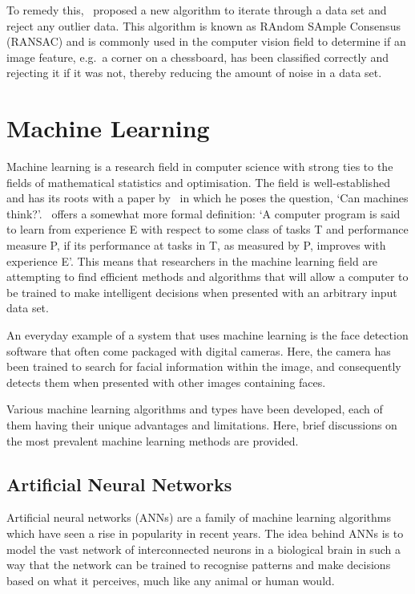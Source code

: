 To remedy this,~\cite{fischler1981random} proposed a new algorithm to iterate through a data set and reject any outlier data. This algorithm is known as RAndom SAmple Consensus (RANSAC) and is commonly used in the computer vision field to determine if an image feature, e.g.\ a corner on a chessboard, has been classified correctly and rejecting it if it was not, thereby reducing the amount of noise in a data set. 

\section{Machine Learning}

Machine learning is a research field in computer science with strong ties to the fields of mathematical statistics and optimisation. The field is well-es\-tab\-lished and has its roots with a paper by~\cite{turing1950computing} in which he poses the question, `Can machines think?'.~\cite{michalski2013machine} offers a somewhat more formal definition: `A computer program is said to learn from experience E with respect to some class of tasks T and performance measure P, if its performance at tasks in T, as measured by P, improves with experience E'. This means that researchers in the machine learning field are attempting to find efficient methods and algorithms that will allow a computer to be trained to make intelligent decisions when presented with an arbitrary input data set. 

An everyday example of a system that uses machine learning is the face detection software that often come packaged with digital cameras. Here, the camera has been trained to search for facial information within the image, and consequently detects them when presented with other images containing faces.

Various machine learning algorithms and types have been developed, each of them having their unique advantages and limitations. Here, brief discussions on the most prevalent machine learning methods are provided. 

\subsection{Artificial Neural Networks}

Artificial neural networks (ANNs) are a family of machine learning algorithms which have seen a rise in popularity in recent years. The idea behind ANNs is to model the vast network of interconnected neurons in a biological brain in such a way that the network can be trained to recognise patterns and make decisions based on what it perceives, much like any animal or human would. 

